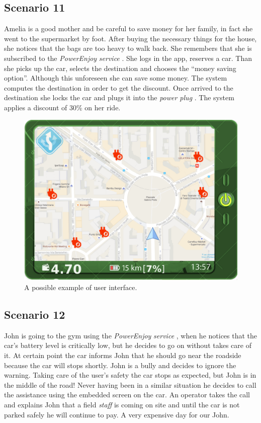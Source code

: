 \documentclass[english]{article}
\newcommand{\powerenjoy}{\textit{PowerEnjoy }}
\newcommand{\staff}{\textit{staff }}
\newcommand{\service}{\textit{service }}
\newcommand{\powerplug}{\textit{power plug }}
\begin{document}
	\subsection{Scenario 11}
		Amelia is a good mother and be careful to save money for her family, in fact she went to the supermarket by foot. After buying the necessary things for the house, she notices that the bags are too heavy to walk back. She remembers that she is subscribed to the \powerenjoy \service. She logs in the app, reserves a car. Than she picks up the car, selects the destination and chooses the ``money saving option''. Although this unforeseen she can save some money. The system computes the destination in order to get the discount. Once arrived to the destination she locks the car and plugs it into the \powerplug. The system applies a discount of 30\% on her ride.
		
	\noindent
	\begin{figure}[H]
		\centering
		\includegraphics[scale=0.3]{screen.pdf}%
		\caption{ A possible example of user interface. }
	\end{figure}	
		
	\subsection{Scenario 12}
		John is going to the gym using the \powerenjoy \service, when he notices that the car's battery level is critically low, but he decides to go on without takes care of it. At certain point the car informs John that he should go near the roadside because the car will stops shortly. John is a bully and decides to ignore the warning. Taking care of the user's safety the car stops as expected, but John is in the middle of the road! Never having been in a similar situation he decides to call the assistance using the embedded screen on the car. An operator takes the call and explains John that a field \staff is coming on site and until the car is not parked safely he will continue to pay. A very expensive day for our John.		
		
\end{document}
